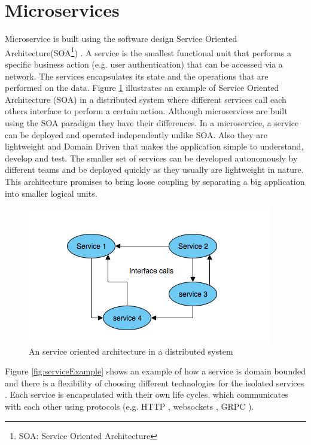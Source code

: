 \newpage
\section{Microservices}

Microservice is built using the software design Service Oriented Architecture(SOA\footnote{SOA: Service Oriented Architecture}) \cite[chapter ~3]{SOA}. A service 
is the smallest functional unit that performs a specific business action (e.g. user authentication) that can be accessed via a network. 
The services encapsulates its state and the operations that are performed on the data.  
Figure \ref{fig:objectBasedDS} illustrates an example of Service Oriented Architecture (SOA) in a distributed system where different services call each others interface
to perform a certain action. Although microservices are built using the SOA paradigm they have their differences. In a microservice, a service can be deployed and 
operated independently unlike SOA.
Also they are lightweight and Domain Driven \cite{DDD} that makes the application simple to understand, develop and test. The smaller set of services
can be developed autonomously by different teams and be deployed quickly as they usually are lightweight in nature. This architecture promises to bring loose coupling 
by separating a big application into smaller logical units. 


\begin{figure}[H]
    \centering \includegraphics[scale=0.7]{grafiken/objectBasedDS.png}
    \caption{An service oriented architecture in a distributed system 
        \cite[p.~62]{DistributedSystems}}
    \label{fig:objectBasedDS}
\end{figure}


Figure \ref{fig:serviceExample} shows an example of how 
a service is domain bounded and there is a flexibility of choosing different
technologies for the isolated services \cite{MicroserviceNewMan}. 
Each service is encapsulated with their own life cycles, which communicates with each other using protocols 
(e.g. HTTP \cite{HTTP}, websockets \cite{WebSockets}, GRPC \cite{grpc}). 

